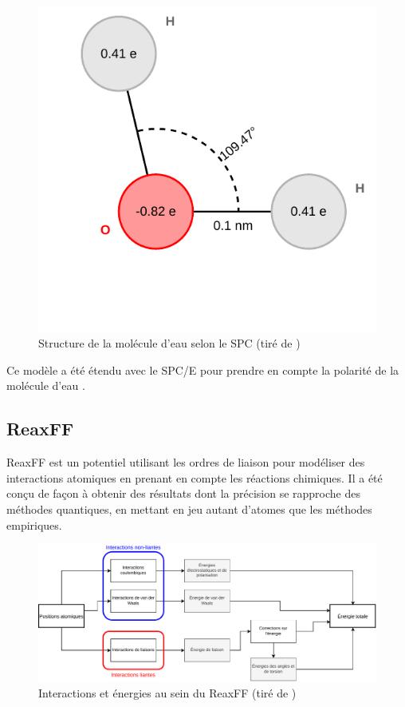 \documentclass[11pt, a4paper]{article}
\begin{document}
\begin{figure}[hpbt]
	\centering
	\includegraphics[scale=0.6]{H2O-SPCE-structure.pdf}
	\caption{Structure de la molécule d'eau selon le SPC (tiré de \cite{pullman_interaction_1981})}
	\label{fig:spc-structure}
\end{figure}

Ce modèle a été étendu avec le SPC/E pour prendre en compte la polarité de la molécule d'eau \cite{berendsen_missing_1987}.

	\subsection{ReaxFF}

ReaxFF \cite{russo_atomistic-scale_2011}\cite{senftle_reaxff_2016} est un potentiel utilisant les ordres de liaison pour modéliser des interactions atomiques en prenant en compte les réactions chimiques. Il a été conçu de façon à obtenir des résultats dont la précision se rapproche des méthodes quantiques, en mettant en jeu autant d'atomes que les méthodes empiriques.

\begin{figure}[hbpt]
	\centering
	\includegraphics[width=\linewidth]{H2O-ReaxFF-interactions.pdf}
	\caption{Interactions et énergies au sein du ReaxFF (tiré de \cite{russo_atomistic-scale_2011})}
	\label{fig:reaxff-interactions}
\end{figure}
\end{document}
